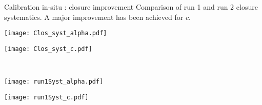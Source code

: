 \begin{frame}{Calibration in-situ : closure improvement}
  Comparison of run 1 and run 2 closure systematics. A major improvement has been achieved for $c$.
  
    \begin{minipage}{0.42\linewidth}
\texttt{[image: Clos\_syst\_alpha.pdf]}
  \end{minipage}
  \hfill
  \begin{minipage}{0.42\linewidth}
\texttt{[image: Clos\_syst\_c.pdf]}
  \end{minipage}\\
    \begin{minipage}{0.42\linewidth}
  \texttt{[image: run1Syst\_alpha.pdf]}
  \end{minipage}
  \hfill
  \begin{minipage}{0.42\linewidth}
  \texttt{[image: run1Syst\_c.pdf]}
  \end{minipage}\\

\end{frame}
